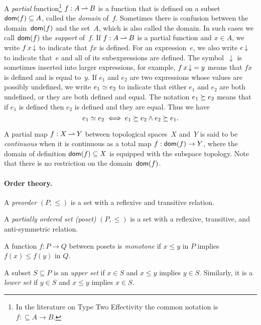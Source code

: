 A \emph{partial} function\footnote{In the literature on Type Two
  Effectivity the common notation is $f \mathbin{{:}{\subseteq}} A \to
  B$.} $f: A \mathbin{\rightharpoonup} B$ is a function that is defined on a subset
$\mathsf{dom}(f) \subseteq A$, called the \emph{domain} of~$f$. Sometimes
there is confusion between the domain~$\mathsf{dom}(f)$ and the set~$A$, which
is also called the domain. In such cases we call $\mathsf{dom}(f)$ the
\emph{support} of~$f$. If $f: A \mathbin{\rightharpoonup} B$ is a partial function and $x
\in A$, we write $f\, x\,{\downarrow}$ to indicate that $f x$ is defined.
For an expression~$e$, we also write $e\,{\downarrow}$ to indicate
that~$e$ and all of its subexpressions are defined. The
symbol~$\downarrow$ is sometimes inserted into larger expressions, for
example, $f\, x\,{\downarrow} = y$ means that $f x$ is defined and is
equal to~$y$. If $e_1$ and $e_2$ are two expressions whose values are
possibly undefined, we write $e_1 \simeq e_2$ to indicate that either
$e_1$ and $e_2$ are both undefined, or they are both defined and
equal. The notation $e_1 \succeq e_2$ means that if $e_1$ is defined
then $e_2$ is defined and they are equal. Thus we have
%
\begin{equation*}
  e_1 \simeq e_2 \iff e_1 \succeq e_2 \land e_2 \succeq e_1.
\end{equation*}

A partial map $f: X \mathbin{\rightharpoonup} Y$ between topological spaces~$X$ and~$Y$
is said to be \emph{continuous} when it is continuous as a total map
$f: \mathsf{dom}(f) \to Y$, where the domain of definition $\mathsf{dom}(f) \subseteq
X$ is equipped with the subspace topology. Note that there is no
restriction on the domain~$\mathsf{dom}(f)$.




\paragraph{Order theory.}

A \emph{preorder} $(P, {\leq})$ is a set with a reflexive and
transitive relation.

A \emph{partially ordered set (poset)} $(P, {\leq})$ is a set with a
reflexive, transitive, and anti-symmetric relation.

A function $f : P \to Q$ between posets is \emph{monotone} if $x \leq
y$ in $P$ implies $f(x) \leq f(y)$ in $Q$.

A subset $S \subseteq P$ is an \emph{upper set} if $x \in S$ and $x
\leq y$ implies $y \in S$. Similarly, it is a \emph{lower set} if $y
\in S$ and $x \leq y$ implies $x \in S$.

